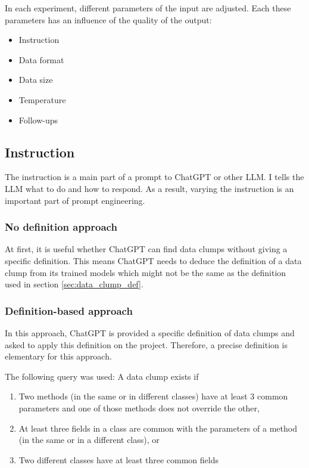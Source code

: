 In each experiment, different parameters of the input are adjusted. Each these parameters has an influence of the quality of the output:

\begin{itemize}
    \item Instruction
    \item Data format
    \item Data size
    \item Temperature
    \item Follow-ups
\end{itemize}

\subsection{Instruction}\label{sec:llm_instruction}
The instruction is a main part of a prompt to ChatGPT or other \ac{LLM}. I tells the  \ac{LLM} what to do and how to respond. As a result, varying the instruction is an important part of prompt engineering. 

\subsubsection{No definition approach}
At first, it is useful whether ChatGPT can find data clumps without giving a specific definition. This means ChatGPT needs to deduce the definition of a data clump from its trained models which might not be the same as the definition used in section \ref{sec:data_clump_def}.
\begin{comment}
Nevertheless, the results are fairly good. ChatGPT ignores the inheritance between \textit{MathStuff} and \textit{BetterMathStuff} and does not output a data clump for each method in \textit{MathStuff}
\end{comment}
\subsubsection{Definition-based approach}
In this approach, ChatGPT is provided a specific definition of data clumps and asked to apply this definition on the project. Therefore, a precise definition is elementary for this approach.

The following query was used:
A data clump exists if
\begin{enumerate}
\item  Two methods (in the same or in different classes) have at least 3 common parameters
    and one of those methods does not override the other, 
\item At least three fields in a class are common with the parameters of a method (in the same or in a different class), or 
\item Two different classes have at least three common fields
\end{enumerate}

